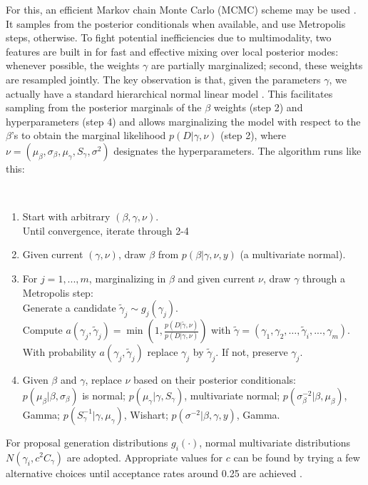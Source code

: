 For this, an efficient 
Markov chain Monte Carlo (MCMC) scheme
may be used \citep{muller1998issues}. It 
 samples from the posterior conditionals when available, and use
Metropolis steps, otherwise. To fight potential inefficiencies due to
multimodality, two features are built in 
 for
fast and effective mixing over local posterior modes:
whenever
possible, the weights $\gamma$ are 
partially marginalized; second,
these weights are resampled jointly.
The key observation is that,
given
the parameters $\gamma $,
we actually have a standard hierarchical normal linear
model \citep{french}. This facilitates sampling from the posterior marginals of the $\beta $ weights (step 2)
 and hyperparameters (step 4) and 
 allows marginalizing the model with respect
 to the $\beta$'s
  to obtain the marginal likelihood $p(D|\gamma, \nu)$
  (step 2), where $\nu=(\mu_\beta,\sigma_\beta,\mu_\gamma,S_\gamma,\sigma^2)$ designates the hyperparameters.
The algorithm runs like this:
{\tt 
\begin{enumerate}
  \item  Start with arbitrary $(\beta , \gamma ,\nu )$.\\
    Until convergence, iterate through 2-4
  \item  Given current $(\gamma,\nu)$, draw  
    $\beta$ from  
    $p(\beta|\gamma,\nu,y)$ (a multivariate normal).
    \item  For $j=1,...,m$,
    marginalizing in $\beta$ and given current $\nu$, draw $\gamma$ through a
    Metropolis step: \\
    Generate a candidate $\tilde\gamma_j \sim g_j(\gamma_j)$. \\
    Compute 
    $
       a(\gamma_j,\tilde\gamma_j) =
       \min\left(1,\frac{p(D |\tilde\gamma,\nu)}
                       {p(D |\gamma,\nu)}\right)
    $
    with $\tilde\gamma = (\gamma_1,\gamma_2,\ldots,\tilde\gamma_i, ...,\gamma_m)$.\\
    With probability $a(\gamma_j,\tilde\gamma_j)$ replace $\gamma_j$
    by $\tilde\gamma_j$. If not, preserve $\gamma_j$.
      \item Given $\beta$ and $\gamma$, replace $\nu$
        based on their posterior conditionals:\\
 $p(\mu_\beta|\beta,\sigma_\beta)$ is normal;
 $p(\mu_\gamma|\gamma,S_\gamma)$, multivariate normal;
 $p(\sigma_\beta^{-2}|\beta,\mu_\beta)$, Gamma; 
    $p(S_\gamma^{-1}|\gamma,\mu_\gamma)$, Wishart; 
    $p(\sigma^{-2}|\beta,\gamma,y)$, Gamma.
    \end{enumerate}
}
\noindent For proposal generation distributions $g_i(\cdot)$,
normal multivariate distributions
$N(\gamma_i,c^2 C_\gamma)$ are 
adopted. %
Appropriate values for $c$ can be found by trying
a few alternative choices until acceptance rates around
 0.25 are achieved \citep{gamerman}. 

